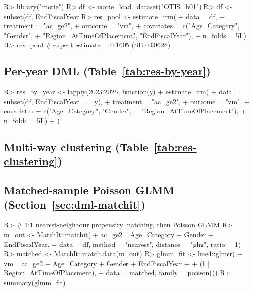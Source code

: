 \documentclass[article,shortnames,nojss]{jss}
\begin{document}
\begin{Code}
R> library("morie")
R> df  <- morie_load_dataset("OTIS_b01")
R> df  <- subset(df, EndFiscalYear %
R> res_pool <- estimate_irm(
+    data       = df,
+    treatment  = "ac_ge2",
+    outcome    = "vm",
+    covariates = c("Age_Category", "Gender",
+                   "Region_AtTimeOfPlacement", "EndFiscalYear"),
+    n_folds    = 5L)
R> res_pool   # expect estimate = 0.1605 (SE 0.00628)
\end{Code}

\subsection[Per-year DML]{Per-year DML (Table~\ref{tab:res-by-year})}

\begin{Code}
R> res_by_year <- lapply(2023:2025, function(y) {
+    estimate_irm(
+      data       = subset(df, EndFiscalYear == y),
+      treatment  = "ac_ge2",
+      outcome    = "vm",
+      covariates = c("Age_Category", "Gender",
+                     "Region_AtTimeOfPlacement"),
+      n_folds    = 5L)
+  })
\end{Code}

\subsection[Multi-way clustering]{Multi-way clustering (Table~\ref{tab:res-clustering})}


\subsection[Matched-sample Poisson GLMM]{Matched-sample Poisson GLMM (Section~\ref{sec:dml-matchit})}

\begin{Code}
R> # 1:1 nearest-neighbour propensity matching, then Poisson GLMM
R> m_out <- MatchIt::matchit(
+    ac_ge2 ~ Age_Category + Gender + EndFiscalYear,
+    data = df, method = "nearest", distance = "glm", ratio = 1)
R> matched <- MatchIt::match.data(m_out)
R> glmm_fit <- lme4::glmer(
+    vm ~ ac_ge2 + Age_Category + Gender + EndFiscalYear +
+         (1 | Region_AtTimeOfPlacement),
+    data = matched, family = poisson())
R> summary(glmm_fit)
\end{Code}
\end{document}
